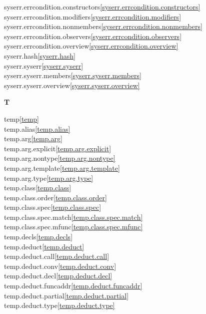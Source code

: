 \begin{multicols}{2}
syserr.errcondition.constructors\quad\ref{syserr.errcondition.constructors}\\
syserr.errcondition.modifiers\quad\ref{syserr.errcondition.modifiers}\\
syserr.errcondition.nonmembers\quad\ref{syserr.errcondition.nonmembers}\\
syserr.errcondition.observers\quad\ref{syserr.errcondition.observers}\\
syserr.errcondition.overview\quad\ref{syserr.errcondition.overview}\\
syserr.hash\quad\ref{syserr.hash}\\
syserr.syserr\quad\ref{syserr.syserr}\\
syserr.syserr.members\quad\ref{syserr.syserr.members}\\
syserr.syserr.overview\quad\ref{syserr.syserr.overview}\\
\par \textbf{T}\par
temp\quad\ref{temp}\\
temp.alias\quad\ref{temp.alias}\\
temp.arg\quad\ref{temp.arg}\\
temp.arg.explicit\quad\ref{temp.arg.explicit}\\
temp.arg.nontype\quad\ref{temp.arg.nontype}\\
temp.arg.template\quad\ref{temp.arg.template}\\
temp.arg.type\quad\ref{temp.arg.type}\\
temp.class\quad\ref{temp.class}\\
temp.class.order\quad\ref{temp.class.order}\\
temp.class.spec\quad\ref{temp.class.spec}\\
temp.class.spec.match\quad\ref{temp.class.spec.match}\\
temp.class.spec.mfunc\quad\ref{temp.class.spec.mfunc}\\
temp.decls\quad\ref{temp.decls}\\
temp.deduct\quad\ref{temp.deduct}\\
temp.deduct.call\quad\ref{temp.deduct.call}\\
temp.deduct.conv\quad\ref{temp.deduct.conv}\\
temp.deduct.decl\quad\ref{temp.deduct.decl}\\
temp.deduct.funcaddr\quad\ref{temp.deduct.funcaddr}\\
temp.deduct.partial\quad\ref{temp.deduct.partial}\\
temp.deduct.type\quad\ref{temp.deduct.type}\\

\end{multicols}
